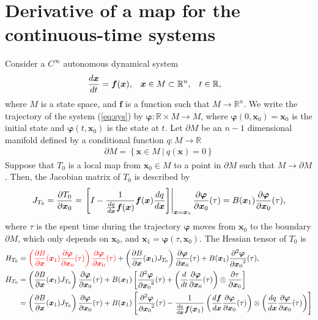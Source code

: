 \documentclass[a4paper]{article}
\newcommand{\R}{\mathbb{R}}
\newcommand{\deriv}[3][1]{%
    \ifthenelse{\equal{#1}{1}}{\frac{d #2}{d #3}}{\frac{d^#1 #2}{{d #3}^#1}}
}
\newcommand{\pderiv}[3][1]{%
    \ifthenelse{\equal{#1}{1}}{\frac{\partial #2}{\partial #3}}{\frac{\partial^#1 #2}{{\partial #3}^#1}}
}
\newcommand{\jac}{J}
\newcommand{\hes}{H}
\newcommand{\parens}[1]{\left(#1\right)}
\newcommand{\braces}[1]{\left\{#1\right\}}
\newcommand{\set}[1]{\braces{#1}}
\newcommand{\parm}{\partial\!M}
\newcommand{\brackets}[1]{\left[#1\right]}
\newcommand{\traj}{\bm \varphi}
\newcommand{\red}[1]{\textcolor{red}{#1}}
\begin{document}
\section{Derivative of a map for the continuous-time systems}
Consider a $C^{\infty}$ autonomous dynamical system
\begin{align}
    \begin{aligned}
        \deriv{\bm x}{t} &= \bm f(\bm x), &
        \bm x &\in M \subset \R^n, &
        t &\in \R,
    \end{aligned}
    \label{eq:sys}
\end{align}
where $M$ is a state space, and $\bm f$ is a function such that $M \to \R^n$.
We write the trajectory of the system (\ref{eq:sys}) by $\traj: \R \times M \to M$,
where $\traj(0, \bm x_0) = \bm x_0$ is the initial state
and $\traj(t, \bm x_0)$ is the state at $t$.
Let $\parm$ be an $n-1$ dimensional manifold defined by
a conditional function $q: M \to \R$
\begin{align}
    \parm = \set{
        \bm x \in M ~|~
        q(\bm x) = 0
    }
\end{align}
Suppose that $T_0$ is a local map from $\bm x_0 \in M$ to a point in $\parm$
such that $M \to \parm$.
Then, the Jacobian matrix of $T_0$ is described by
\begin{align}
    \jac_{T_0} = \pderiv{T_0}{\bm x_0} =
    \left.
    \brackets{
        I -
        \frac{1}{\deriv{q}{\bm x} \bm f(\bm x)}
        \bm f(\bm x) \deriv{q}{\bm x}
    }
    \right|_{\bm x = \bm x_1}
    \pderiv{\traj}{\bm x_0}(\tau)
    =
    B(\bm x_1) \pderiv{\traj}{\bm x_0}(\tau),
\end{align}
where $\tau$ is the spent time during the trajectory $\traj$
moves from $\bm x_0$ to the boundary $\parm$, which only depends on $\bm x_0$,
and $\bm x_1 = \traj(\tau, \bm x_0)$.
The Hessian tensor of $T_0$ is
\begin{align}
    \hes_{T_0}
    &=
    \red{\parens{
        \pderiv{B}{\bm x} (\bm x_1) \pderiv{\traj}{\bm x_0}(\tau)
    }
    \pderiv{\traj}{\bm x_0}(\tau)}
    +
    {\parens{
        \pderiv{B}{\bm x} (\bm x_1) \jac_{T_0}
    }
    \pderiv{\traj}{\bm x_0}(\tau)}
    +
    B(\bm x_1) \pderiv[2]{\traj}{\bm x_0}(\tau),
    \\
    \hes_{T_0}
    &=
    \parens{\pderiv{B}{\bm x}(\bm x_1) \jac_{T_0}}\pderiv{\traj}{\bm x_0}(\tau)
    +
    B(\bm x_1)\brackets{
        \pderiv[2]{\traj}{\bm x_0}(\tau)
        +
        \parens{\deriv{}{t} \pderiv{\traj}{\bm x_0}(\tau)} \otimes \pderiv{\tau}{\bm x_0}
    }
    \\
    &=
    \parens{\pderiv{B}{\bm x}(\bm x_1) \jac_{T_0}}\pderiv{\traj}{\bm x_0}(\tau)
    +
    B(\bm x_1)\brackets{
        \pderiv[2]{\traj}{\bm x_0}(\tau)
        -\frac{1}{\deriv{q}{\bm x}\bm f(\bm x_1)}
        \parens{\deriv{\bm f}{\bm x}\pderiv{\traj}{\bm x_0}(\tau)} \otimes
        \parens{\deriv{q}{\bm x} \pderiv{\traj}{\bm x_0}(\tau)}
    }
\end{align}
\end{document}
